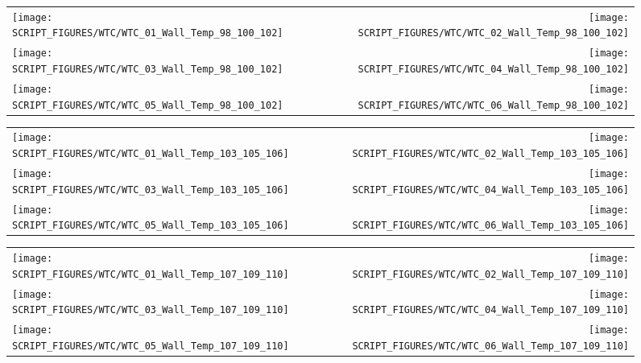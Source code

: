 \begin{figure}[p]
\begin{tabular*}{\textwidth}{l@{\extracolsep{\fill}}r}
\texttt{[image: SCRIPT\_FIGURES/WTC/WTC\_01\_Wall\_Temp\_98\_100\_102]} &
\texttt{[image: SCRIPT\_FIGURES/WTC/WTC\_02\_Wall\_Temp\_98\_100\_102]} \\
\texttt{[image: SCRIPT\_FIGURES/WTC/WTC\_03\_Wall\_Temp\_98\_100\_102]} &
\texttt{[image: SCRIPT\_FIGURES/WTC/WTC\_04\_Wall\_Temp\_98\_100\_102]} \\
\texttt{[image: SCRIPT\_FIGURES/WTC/WTC\_05\_Wall\_Temp\_98\_100\_102]} &
\texttt{[image: SCRIPT\_FIGURES/WTC/WTC\_06\_Wall\_Temp\_98\_100\_102]}
\end{tabular*}
\label{NIST_WTC_Wall_98_100_102}
\end{figure}

\begin{figure}[p]
\begin{tabular*}{\textwidth}{l@{\extracolsep{\fill}}r}
\texttt{[image: SCRIPT\_FIGURES/WTC/WTC\_01\_Wall\_Temp\_103\_105\_106]} &
\texttt{[image: SCRIPT\_FIGURES/WTC/WTC\_02\_Wall\_Temp\_103\_105\_106]} \\
\texttt{[image: SCRIPT\_FIGURES/WTC/WTC\_03\_Wall\_Temp\_103\_105\_106]} &
\texttt{[image: SCRIPT\_FIGURES/WTC/WTC\_04\_Wall\_Temp\_103\_105\_106]} \\
\texttt{[image: SCRIPT\_FIGURES/WTC/WTC\_05\_Wall\_Temp\_103\_105\_106]} &
\texttt{[image: SCRIPT\_FIGURES/WTC/WTC\_06\_Wall\_Temp\_103\_105\_106]}
\end{tabular*}
\label{NIST_WTC_Wall_103_105_106}
\end{figure}

\begin{figure}[p]
\begin{tabular*}{\textwidth}{l@{\extracolsep{\fill}}r}
\texttt{[image: SCRIPT\_FIGURES/WTC/WTC\_01\_Wall\_Temp\_107\_109\_110]} &
\texttt{[image: SCRIPT\_FIGURES/WTC/WTC\_02\_Wall\_Temp\_107\_109\_110]} \\
\texttt{[image: SCRIPT\_FIGURES/WTC/WTC\_03\_Wall\_Temp\_107\_109\_110]} &
\texttt{[image: SCRIPT\_FIGURES/WTC/WTC\_04\_Wall\_Temp\_107\_109\_110]} \\
\texttt{[image: SCRIPT\_FIGURES/WTC/WTC\_05\_Wall\_Temp\_107\_109\_110]} &
\texttt{[image: SCRIPT\_FIGURES/WTC/WTC\_06\_Wall\_Temp\_107\_109\_110]}
\end{tabular*}
\label{NIST_WTC_Wall_107_109_110}
\end{figure}


